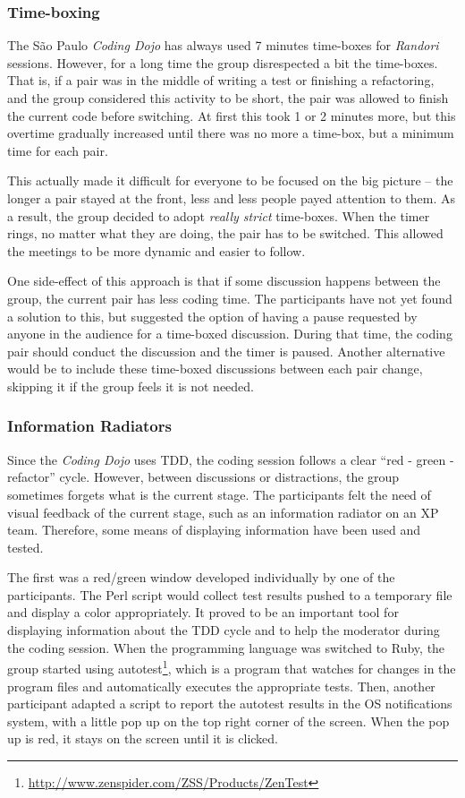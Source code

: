 \subsubsection{Time-boxing}

The São Paulo \emph{Coding Dojo} has always used 7 minutes time-boxes
for \emph{Randori} sessions. However, for a long time the group
disrespected a bit the time-boxes. That is, if a pair was in the
middle of writing a test or finishing a refactoring, and the group
considered this activity to be short, the pair was allowed to finish
the current code before switching. At first this took 1 or 2 minutes
more, but this overtime gradually increased until there was no more a
time-box, but a minimum time for each pair.

This actually made it difficult for everyone to be focused on the big
picture -- the longer a pair stayed at the front, less and less people
payed attention to them. As a result, the group decided to adopt
\emph{really strict} time-boxes. When the timer rings, no matter
what they are doing, the pair has to be switched. This allowed the
meetings to be more dynamic and easier to follow.

One side-effect of this approach is that if some discussion happens
between the group, the current pair has less coding time. The
participants have not yet found a solution to this, but suggested the
option of having a pause requested by anyone in the audience for a
time-boxed discussion. During that time, the coding pair should
conduct the discussion and the timer is paused. Another
alternative would be to include these time-boxed discussions between
each pair change, skipping it if the group feels it is not needed.

\subsubsection{Information Radiators}

Since the \emph{Coding Dojo} uses TDD, the coding session follows a
clear ``red - green - refactor'' cycle. However, between discussions or
distractions, the group sometimes forgets what is the current
stage. The participants felt the need of visual feedback of the
current stage, such as an information radiator on an XP team. Therefore,
some means of displaying information have been used and tested.

The first was a red/green window developed individually by one of the
participants. The Perl script would collect test results pushed to a
temporary file and display a color appropriately. It proved to be an
important tool for displaying information about the TDD cycle and to
help the moderator during the coding session. When the programming
language was switched to Ruby, the group started using
autotest\footnote{\url{http://www.zenspider.com/ZSS/Products/ZenTest}},
which is a program that watches for changes in the program files and
automatically executes the appropriate tests. Then, another
participant adapted a script to report the autotest results in the OS
notifications system, with a little pop up on the top right corner of
the screen. When the pop up is red, it stays on the screen until it is
clicked.

